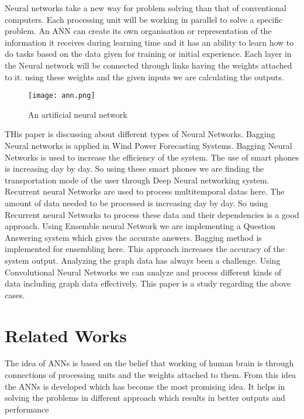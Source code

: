 \documentclass[10pt,a4paper,journal]{IEEEtran}
\begin{document}
\hspace{2em} Neural networks take a new way for problem solving than that of conventional computers. Each processing unit will be working in parallel to solve a specific problem. An ANN can create its own organisation or representation of the information it receives during learning time and it has an ability to learn how to do tasks based on the data given for training or initial experience. Each layer in the Neural network will be connected through links having the weights attached to it. using these weights and the given inputs we are calculating the outputs.

\begin{figure}[htbp]
\begin{center}
\hbox{\texttt{[image: ann.png]}}
\caption{An artificial neural network}
\label{4}
\end{center}
\end{figure}

\hspace{2em} THis paper is discussing about different types of Neural Networks. Bagging Neural networks is applied in Wind Power Forecasting Systems. Bagging Neural Networks is used to increase the efficiency of the system. The use of smart phones is increasing day by day. So using these smart phones we are finding the transportation mode of the user through Deep Neural networking system. Recurrent neural Networks are used to process multitemporal datas here. The amount of data needed to be processed is increasing day by day. So using Recurrent neural Networks to process these data and their dependencies is a good approach. Using Ensemble neural Network we are implementing a Question Answering system which gives the accurate answers. Bagging method is implemented for ensembling here. This approach increases the accuracy of the system output. Analyzing the graph data has always been a challenge. Using Convolutional Neural Networks we can analyze and process different kinds of data including graph data effectively. This paper is a study regarding the above cases.

\section{Related Works}

\hspace{2em}The idea of ANNs is based on the belief that working of human brain is through connections of processing units and the weights attached to them. From this idea the ANNs is developed which has become the most promising idea. It helps in solving the problems in different approach which results in better outputs and performance \\
\end{document}
